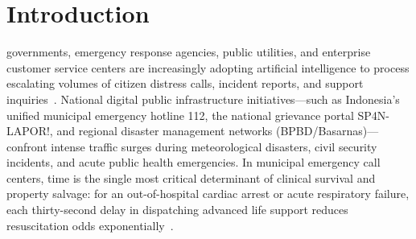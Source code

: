 \documentclass[journal,compsoc]{IEEEtran}
\begin{document}
\maketitle
\IEEEdisplaynontitleabstractindextext
\IEEEpeerreviewmaketitle

\section{Introduction}
 governments, emergency response agencies, public utilities, and enterprise customer service centers are increasingly adopting artificial intelligence to process escalating volumes of citizen distress calls, incident reports, and support inquiries~\cite{achiam2023gpt4,touvron2023llama}. National digital public infrastructure initiatives—such as Indonesia's unified municipal emergency hotline 112, the national grievance portal SP4N-LAPOR!, and regional disaster management networks (BPBD/Basarnas)—confront intense traffic surges during meteorological disasters, civil security incidents, and acute public health emergencies. In municipal emergency call centers, time is the single most critical determinant of clinical survival and property salvage: for an out-of-hospital cardiac arrest or acute respiratory failure, each thirty-second delay in dispatching advanced life support reduces resuscitation odds exponentially~\cite{zandbergen2022accuracy,eisenberg2001cardiac}.
\end{document}
